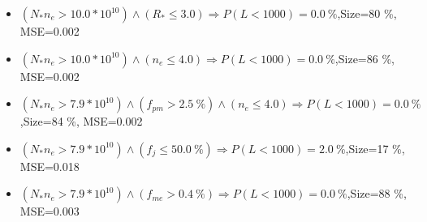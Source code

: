 \documentclass[numbered]{CSL}
\begin{document}
\begin{itemize}
\item $(N_* n_e > 10.0 * 10^{10}) \land (R_* \leq 3.0) \Rightarrow P(L < 1 000) = 0.0~\%$,\hfill Size=80 \%, MSE=0.002
\item $(N_* n_e > 10.0 * 10^{10}) \land (n_e \leq 4.0) \Rightarrow P(L < 1 000) = 0.0~\%$,\hfill Size=86 \%, MSE=0.002
\item $(N_* n_e > 7.9 * 10^{10}) \land (f_{pm} > 2.5~\%) \land (n_e \leq 4.0) \Rightarrow P(L < 1 000) = 0.0~\%$,\hfill Size=84 \%, MSE=0.002
\item $(N_* n_e > 7.9 * 10^{10}) \land (f_j \leq 50.0~\%) \Rightarrow P(L < 1 000) = 2.0~\%$,\hfill Size=17 \%, MSE=0.018
\item $(N_* n_e > 7.9 * 10^{10}) \land (f_{me} > 0.4~\%) \Rightarrow P(L < 1 000) = 0.0~\%$,\hfill Size=88 \%, MSE=0.003
\end{itemize}
\end{document}
